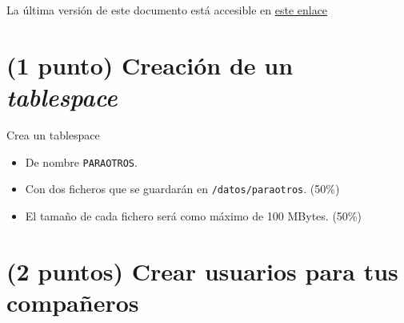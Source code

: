 \documentclass[a4paper]{article}
\begin{document}
La última versión de este documento está accesible en \href{https://alvarogonzalezsotillo.github.io/apuntes-clase/sistemas-gestores-bbdd-asir2/apuntes/1/asgbd-1-practica-usuarios-permisos-ii.pdf}{este enlace}
\section{(1 punto) Creación de un \emph{tablespace}}
\label{sec:org0000003}

Crea un tablespace
\begin{itemize}
\item De nombre \texttt{PARAOTROS}.
\item Con dos ficheros que se guardarán en \texttt{/datos/paraotros}. (50\%)
\item El tamaño de cada fichero será como máximo de 100 MBytes. (50\%)
\end{itemize}
\section{(2 puntos) Crear usuarios para tus compañeros}
\label{sec:org0000006}
\end{document}
